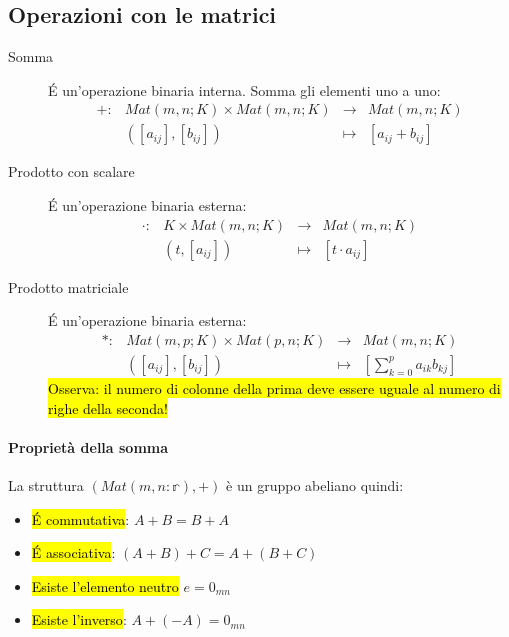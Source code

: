\documentclass[a4paper,12pt,oneside]{article}
\begin{document}
\subsection{Operazioni con le matrici}
\begin{description}
    \item[Somma] \'E un'operazione binaria interna. Somma gli elementi uno a uno:
        \[
            \begin{array}{cccc}
                +: & Mat(m,n;K) \times Mat(m,n;K) & \to &Mat(m,n;K) \\
                & ([a_{ij}], [b_{ij}]) &\mapsto  & [a_{ij} + b_{ij}]
            \end{array}
        \]
    \item[Prodotto con scalare] \'E un'operazione binaria esterna:
        \[
            \begin{array}{cccc}
                \cdot: & K \times Mat(m,n;K) & \to &Mat(m,n;K) \\
                & (t, [a_{ij}]) &\mapsto  & [t \cdot a_{ij}]
            \end{array}
        \]
    \item[Prodotto matriciale] \'E un'operazione binaria esterna:
        \[
            \begin{array}{cccc}
                \ast: & Mat(m,p;K) \times Mat(p,n;K) & \to &Mat(m,n;K) \\
                & ([a_{ij}], [b_{ij}]) &\mapsto  & [\sum_{k=0}^p a_{ik}b_{kj}]
            \end{array}
        \]
        \hl{Osserva: il numero di colonne della prima deve essere uguale al numero
            di righe della seconda!}
\end{description}

\paragraph{Proprietà della somma} La struttura $(Mat(m,n:\mathbb{r}), +)$ è un
gruppo abeliano quindi:
\begin{itemize}
    \item \hl{\'E commutativa}: $A + B = B + A$
    \item \hl{\'E associativa}: $(A + B) + C = A + (B + C)$
    \item \hl{Esiste l'elemento neutro} $e = 0_{mn}$
    \item \hl{Esiste l'inverso}: $A + (-A) = 0_{mn}$
\end{itemize}
\end{document}
